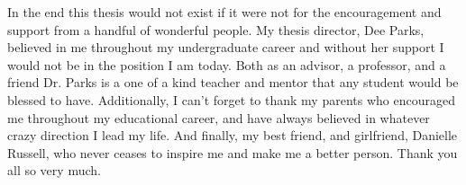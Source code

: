 \begin{acknowledgement}

In the end this thesis would not exist if it were not for the encouragement and support from a handful of wonderful people. My thesis director, Dee Parks, believed in me throughout my undergraduate career and without her support I would not be in the position I am today. Both as an advisor, a professor, and a friend Dr. Parks is a one of a kind teacher and mentor that any student would be blessed to have. Additionally, I can't forget to thank my parents who encouraged me throughout my educational career, and have always believed in whatever crazy direction I lead my life. And finally, my best friend, and girlfriend, Danielle Russell, who never ceases to inspire me and make me a better person. Thank you all so very much.

\end{acknowledgement}
